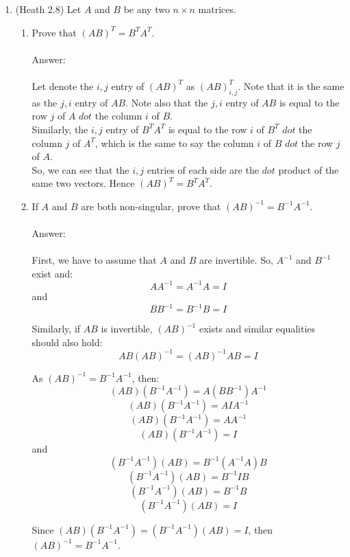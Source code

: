 \documentclass{article}
\begin{document}
\begin{enumerate}
\item (Heath 2.8) Let $A$ and $B$ be any two $n \times n$ matrices.
\begin{enumerate}
\item Prove that $(AB)^T=B^TA^T$.\\
\\
Answer:\\
\\
Let denote the $i,j$ entry of $(AB)^T$ as $(AB)_{i,j}^T$.  Note that it is the same as the $j,i$ entry of $AB$. Note also that the $j,i$ entry of $AB$ is equal to the row $j$ of $A$ $dot$ the column $i$ of $B$.\\
Similarly, the $i,j$ entry of $B^TA^T$ is equal to the row $i$ of $B^T$ $dot$ the column $j$ of $A^T$, which is the same to say the column $i$ of $B$ $dot$ the row $j$ of $A$.\\
So, we can see that the $i,j$ entries of each side are the $dot$ product of the same two vectors.  Hence $(AB)^T=B^TA^T$.

\item If $A$ and $B$ are both non-singular, prove that $(AB)^{-1} = B^{-1}A^{-1}$.\\
\\
Answer:\\
\\
First, we have to assume that $A$ and $B$ are invertible.  So, $A^{-1}$ and $B^{-1}$ exist and:
$$AA^{-1}=A^{-1}A=I$$ and
$$BB^{-1}=B^{-1}B=I$$ 

Similarly, if $AB$ is invertible, $(AB)^{-1}$ exists and similar equalities should also hold:
$$AB(AB)^{-1}=(AB)^{-1}AB=I$$

As $(AB)^{-1} = B^{-1}A^{-1}$, then:
$$(AB)(B^{-1}A^{-1})=A(BB^{-1})A^{-1}$$
$$(AB)(B^{-1}A^{-1})=AIA^{-1}$$
$$(AB)(B^{-1}A^{-1})=AA^{-1}$$
$$(AB)(B^{-1}A^{-1})=I$$
and
$$(B^{-1}A^{-1})(AB)=B^{-1}(A^{-1}A)B$$
$$(B^{-1}A^{-1})(AB)=B^{-1}IB$$
$$(B^{-1}A^{-1})(AB)=B^{-1}B$$
$$(B^{-1}A^{-1})(AB)=I$$

Since $(AB)(B^{-1}A^{-1})=(B^{-1}A^{-1})(AB)=I$, then $(AB)^{-1} = B^{-1}A^{-1}$.

\end{enumerate}
\end{enumerate}
\end{document}

